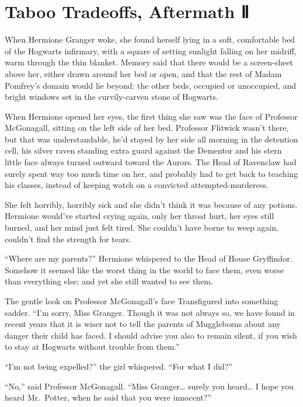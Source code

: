 \chapter{Taboo Tradeoffs, Aftermath Ⅱ}\label{taboo-tradeoffs-aftermath}

When Hermione Granger woke, she found herself lying in a soft,
comfortable bed of the Hogwarts infirmary, with a square of setting
sunlight falling on her midriff, warm through the thin blanket. Memory
said that there would be a screen-sheet above her, either drawn around
her bed or open, and that the rest of Madam Pomfrey's domain would lie
beyond: the other beds, occupied or unoccupied, and bright windows set
in the curvily-carven stone of Hogwarts.

When Hermione opened her eyes, the first thing she saw was the face of
Professor McGonagall, sitting on the left side of her bed. Professor
Flitwick wasn't there, but that was understandable, he'd stayed by her
side all morning in the detention cell, his silver raven standing extra
guard against the Dementor and his stern little face always turned
outward toward the Aurors. The Head of Ravenclaw had surely spent way
too much time on her, and probably had to get back to teaching his
classes, instead of keeping watch on a convicted attempted-murderess.

She felt horribly, horribly sick and she didn't think it was because of
any potions. Hermione would've started crying again, only her throat
hurt, her eyes still burned, and her mind just felt tired. She couldn't
have borne to weep again, couldn't find the strength for tears.

``Where are my parents?'' Hermione whispered to the Head of House
Gryffindor. Somehow it seemed like the worst thing in the world to face
them, even worse than everything else; and yet she still wanted to see
them.

The gentle look on Professor McGonagall's face Transfigured into
something sadder. ``I'm sorry, Miss Granger. Though it was not always
so, we have found in recent years that it is wiser not to tell the
parents of Muggleborns about any danger their child has faced. I should
advise you also to remain silent, if you wish to stay at Hogwarts
without trouble from them.''

``I'm not being expelled?'' the girl whispered. ``For what I did?''

``No,'' said Professor McGonagall. ``Miss Granger\ldots{} surely you
heard\ldots{} I hope you heard Mr.~Potter, when he said that you were
innocent?''

